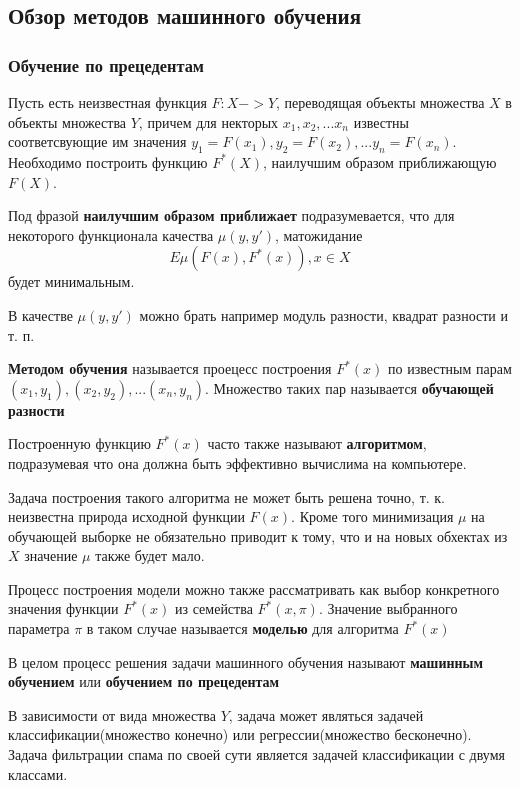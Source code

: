 \subsection{Обзор методов машинного обучения} 
\subsubsection{Обучение по прецедентам}
Пусть есть неизвестная функция $F: X -> Y$, переводящая объекты
множества $X$ в объекты множества $Y$, причем для некторых $x_1, x_2, ... x_n$ известны соответсвующие им значения $y_1 = F(x_1), y_2 = F(x_2), ... y_n = F(x_n)$.
Необходимо построить функцию $F^*(X)$, наилучшим образом приближающую $F(X)$.

Под фразой \textbf{наилучшим образом приближает} подразумевается, что для некоторого функционала качества $\mu(y, y')$, матожидание
\begin{equation}
\label{}
E\mu(F(x), F^*(x)), x \in X
\end{equation}
будет минимальным.

В качестве $\mu(y, y')$ можно брать например модуль разности, квадрат разности и т. п.

\textbf{Методом обучения} называется проецесс построения $F^*(x)$ по известным парам $(x_1, y_1), (x_2, y_2), ... (x_n, y_n)$. Множество таких пар называется \textbf{обучающей разности}

Построенную функцию $F^*(x)$ часто также называют \textbf{алгоритмом}, подразумевая что она должна быть эффективно вычислима на компьютере.

Задача построения такого алгоритма не может быть решена точно, т. к. неизвестна природа исходной функции $F(x)$. Кроме того минимизация $\mu$ на обучающей выборке не обязательно приводит к тому, что и на новых обхектах из $X$ значение $\mu$ также будет мало.

Процесс построения модели можно также рассматривать как выбор конкретного значения функции $F^*(x)$ из семейства $F^*(x, \pi)$. Значение выбранного параметра $\pi$ в таком случае называется \textbf{моделью} для алгоритма
$F^*(x)$

В целом процесс решения задачи машинного обучения называют \textbf{машинным обучением} или \textbf{обучением по прецедентам}

В зависимости от вида множества $Y$, задача может являться задачей классификации(множество конечно) или регрессии(множество бесконечно).
Задача фильтрации спама по своей сути является задачей классификации с двумя классами.

